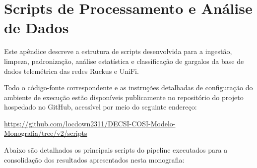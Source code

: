 \chapter{Scripts de Processamento e Análise de Dados}
\label{ap:scripts_processamento}

Este apêndice descreve a estrutura de scripts desenvolvida para a ingestão, limpeza, padronização, análise estatística e classificação de gargalos da base de dados telemétrica das redes Ruckus e UniFi. 

Todo o código-fonte correspondente e as instruções detalhadas de configuração do ambiente de execução estão disponíveis publicamente no repositório do projeto hospedado no GitHub, acessível por meio do seguinte endereço:
\begin{center}
    \url{https://github.com/locdown2311/DECSI-COSI-Modelo-Monografia/tree/v2/scripts}
\end{center}

Abaixo são detalhados os principais scripts do pipeline executados para a consolidação dos resultados apresentados nesta monografia:

